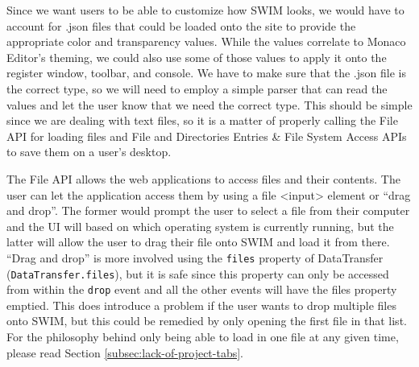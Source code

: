 \documentclass[
    paper=letter,
    parskip=half,
    fontsize=12pt,
    titlepage=firstiscover,
    toc=bibliography,
    numbers=endperiod
]{scrartcl}
\begin{document}
Since we want users to be able to customize how SWIM looks, we would
have to account for .json files that could be loaded onto the site to
provide the appropriate color and transparency values. While the values
correlate to Monaco Editor's theming, we could also use some of those
values to apply it onto the register window, toolbar, and console. We
have to make sure that the .json file is the correct type, so we will
need to employ a simple parser that can read the values and let the user
know that we need the correct type. This should be simple since we are
dealing with text files, so it is a matter of properly calling the File
API for loading files and File and Directories Entries \& File System
Access APIs to save them on a user's desktop.

The File API \cite{mdn-file-api} allows the web applications to access
files and their contents. The user can let the application access them
by using a file \textless input\textgreater{} element or ``drag and
drop''. The former would prompt the user to select a file from their
computer and the UI will based on which operating system is currently
running, but the latter will allow the user to drag their file onto SWIM
and load it from there. ``Drag and drop'' is more involved using the
\texttt{files} property of DataTransfer (\texttt{DataTransfer.files}),
but it is safe since this property can only be accessed from within the
\texttt{drop} event and all the other events will have the files
property emptied. This does introduce a problem if the user wants to
drop multiple files onto SWIM, but this could be remedied by only
opening the first file in that list. For the philosophy behind only
being able to load in one file at any given time, please read Section
\ref{subsec:lack-of-project-tabs}.
\end{document}

